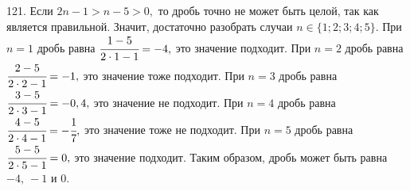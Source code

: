 121. Если $2n-1>n-5>0,$ то дробь точно не может быть целой, так как является правильной. Значит, достаточно разобрать случаи $n\in\{1; 2; 3; 4; 5\}.$ При $n=1$ дробь равна $\cfrac{1-5}{2\cdot1-1}=-4,$ это значение подходит. При $n=2$ дробь равна $\cfrac{2-5}{2\cdot2-1}=-1,$ это значение тоже подходит.
При $n=3$ дробь равна $\cfrac{3-5}{2\cdot3-1}=-0,4,$ это значение не подходит. При $n=4$ дробь равна $\cfrac{4-5}{2\cdot4-1}=-\cfrac{1}{7},$ это значение тоже не подходит. При $n=5$ дробь равна $\cfrac{5-5}{2\cdot5-1}=0,$ это значение подходит. Таким образом, дробь может быть равна $-4,\ -1$ и 0.\\
